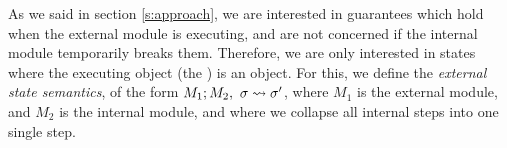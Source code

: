 As we said in section \ref{s:approach}, we are interested in guarantees which hold
when the external module is executing, and are not concerned if the internal module  temporarily
breaks them. Therefore, we are only interested in states where the
executing object (the ) is an  object. 
For this, we define the  \emph{external state semantics}, of the form 
$M_1 ; M_2,\ \sigma \leadsto \sigma'$, where $M_1$ is the external
module, and $M_2$ is the internal module, and where we
collapse all internal steps into one single step.

 

